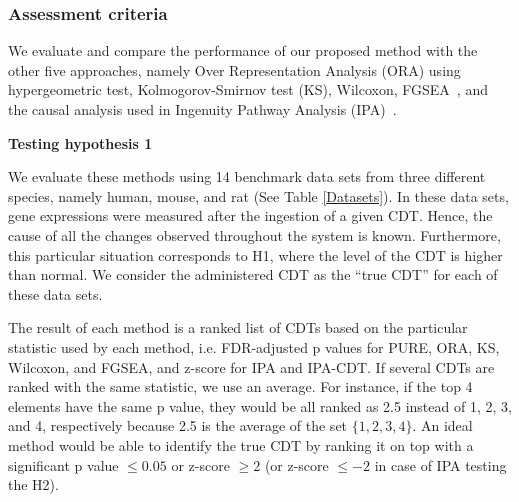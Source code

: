 \subsubsection{Assessment criteria}


We evaluate and compare the performance of our proposed method with the other five approaches, namely Over Representation Analysis (ORA) using hypergeometric test, Kolmogorov-Smirnov test (KS)\cite{massey1951kolmogorov}, Wilcoxon\cite{wilcoxon1945individual}, FGSEA~\cite{korotkevich2021fast}, and the causal analysis used in Ingenuity Pathway Analysis (IPA)~\cite{kramer2013causal}.



\textbf{Testing hypothesis 1}

We evaluate these methods using 14 benchmark data sets from three different species, namely human, mouse, and rat (See Table \ref{Datasets}). 
In these data sets, gene expressions were measured after the ingestion of a given CDT.
Hence, the cause of all the changes observed  throughout the system is known. Furthermore, this particular situation corresponds to  H1, where the level of the CDT is higher than normal.
We consider the administered CDT as the ``true CDT'' for each of these data sets.

The result of each method is a ranked list of CDTs based on the particular statistic used by each method, i.e. FDR-adjusted p values for PURE, ORA, KS, Wilcoxon, and FGSEA, and  z-score  for IPA and IPA-CDT. 
If several CDTs are ranked with the same statistic, we use an average. For instance, if  the top 4 elements have the same p value, they would be all ranked as 2.5 instead of 1, 2, 3, and 4, respectively because 2.5 is the average of the set $\{1, 2, 3, 4\}$.
An ideal method would be able to identify the true CDT by ranking it on top with a significant p value $\leq 0.05$ or  z-score $\geq 2$ (or z-score $\leq -2$ in case of IPA testing the H2).

